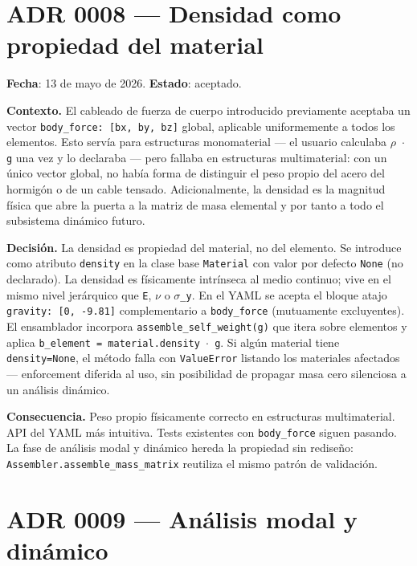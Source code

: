 \documentclass[11pt,oneside]{report}
\begin{document}
\section{ADR 0008 --- Densidad como propiedad del material}
\label{adr:0008}

\textbf{Fecha}: 13 de mayo de 2026. \textbf{Estado}: aceptado.

\textbf{Contexto.} El cableado de fuerza de cuerpo introducido previamente aceptaba un vector \texttt{body\_\allowbreak{}force: [bx, by, bz]} global, aplicable uniformemente a todos los elementos. Esto servía para estructuras monomaterial --- el usuario calculaba \texttt{\ensuremath{\rho} \ensuremath{\cdot} g} una vez y lo declaraba --- pero fallaba en estructuras multimaterial: con un único vector global, no había forma de distinguir el peso propio del acero del hormigón o de un cable tensado. Adicionalmente, la densidad es la magnitud física que abre la puerta a la matriz de masa elemental y por tanto a todo el subsistema dinámico futuro.

\textbf{Decisión.} La densidad es propiedad del material, no del elemento. Se introduce como atributo \texttt{density} en la clase base \texttt{Material} con valor por defecto \texttt{None} (no declarado). La densidad es físicamente intrínseca al medio continuo; vive en el mismo nivel jerárquico que \texttt{E}, \texttt{\ensuremath{\nu}} o \texttt{\ensuremath{\sigma}\_y}. En el YAML se acepta el bloque atajo \texttt{gravity: [0, -9.\allowbreak{}81]} complementario a \texttt{body\_force} (mutuamente excluyentes). El ensamblador incorpora \texttt{assemble\_\allowbreak{}self\_\allowbreak{}weight(g)} que itera sobre elementos y aplica \texttt{b\_\allowbreak{}element = material.\allowbreak{}density \ensuremath{\cdot} g}. Si algún material tiene \texttt{density=None}, el método falla con \texttt{ValueError} listando los materiales afectados --- enforcement diferida al uso, sin posibilidad de propagar masa cero silenciosa a un análisis dinámico.

\textbf{Consecuencia.} Peso propio físicamente correcto en estructuras multimaterial. API del YAML más intuitiva. Tests existentes con \texttt{body\_force} siguen pasando. La fase de análisis modal y dinámico hereda la propiedad sin rediseño: \texttt{Assembler.\allowbreak{}assemble\_\allowbreak{}mass\_\allowbreak{}matrix} reutiliza el mismo patrón de validación.

\section{ADR 0009 --- Análisis modal y dinámico}
\label{adr:0009}
\end{document}
